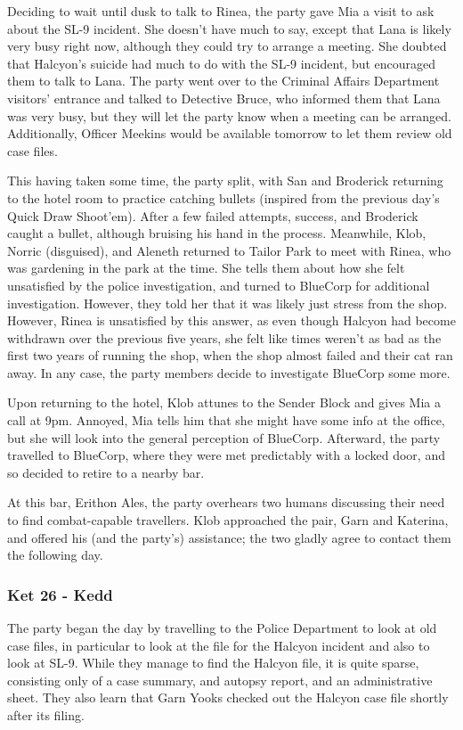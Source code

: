 Deciding to wait until dusk to talk to Rinea, the party gave Mia a visit to ask about the SL-9 incident. She doesn't have much to say, except that Lana is likely very busy right now, although they could try to arrange a meeting. She doubted that Halcyon's suicide had much to do with the SL-9 incident, but encouraged them to talk to Lana. The party went over to the Criminal Affairs Department visitors' entrance and talked to Detective Bruce, who informed them that Lana was very busy, but they will let the party know when a meeting can be arranged. Additionally, Officer Meekins would be available tomorrow to let them review old case files.

This having taken some time, the party split, with San and Broderick returning to the hotel room to practice catching bullets (inspired from the previous day's Quick Draw Shoot'em). After a few failed attempts, success, and Broderick caught a bullet, although bruising his hand in the process. Meanwhile, Klob, Norric (disguised), and Aleneth returned to Tailor Park to meet with Rinea, who was gardening in the park at the time. She tells them about how she felt unsatisfied by the police investigation, and turned to BlueCorp for additional investigation. However, they told her that it was likely just stress from the shop. However, Rinea is unsatisfied by this answer, as even though Halcyon had become withdrawn over the previous five years, she felt like times weren't as bad as the first two years of running the shop, when the shop almost failed and their cat ran away. In any case, the party members decide to investigate BlueCorp some more. 

Upon returning to the hotel, Klob attunes to the Sender Block and gives Mia a call at 9pm. Annoyed, Mia tells him that she might have some info at the office, but she will look into the general perception of BlueCorp. Afterward, the party travelled to BlueCorp, where they were met predictably with a locked door, and so decided to retire to a nearby bar.

At this bar, Erithon Ales, the party overhears two humans discussing their need to find combat-capable travellers. Klob approached the pair, Garn and Katerina, and offered his (and the party's) assistance; the two gladly agree to contact them the following day.

\subsubsection{Ket 26 - Kedd}
The party began the day by travelling to the Police Department to look at old case files, in particular to look at the file for the Halcyon incident and also to look at SL-9. While they manage to find the Halcyon file, it is quite sparse, consisting only of a case summary, and autopsy report, and an administrative sheet. They also learn that Garn Yooks checked out the Halcyon case file shortly after its filing. 